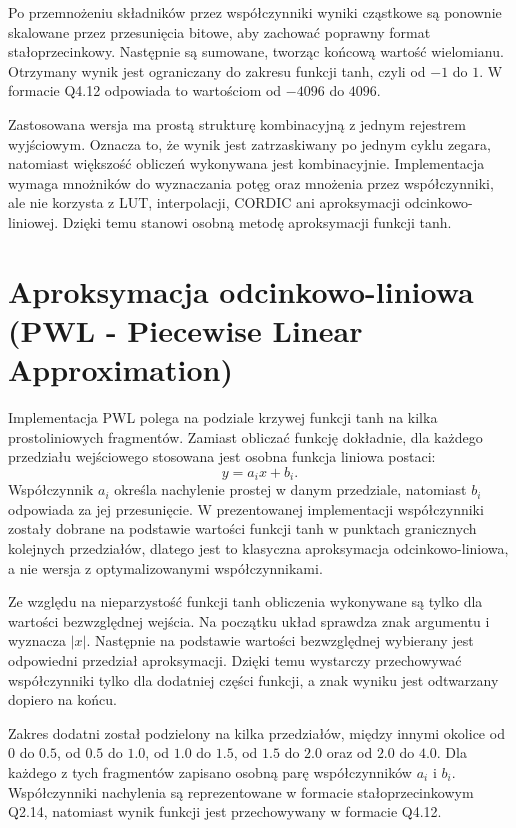 \documentclass[12pt, a4paper, oneside]{scrreprt}
\begin{document}
Po przemnożeniu składników przez współczynniki wyniki cząstkowe są ponownie skalowane
przez przesunięcia bitowe, aby zachować poprawny format stałoprzecinkowy.
Następnie są sumowane, tworząc końcową wartość wielomianu. Otrzymany wynik jest
ograniczany do zakresu funkcji tanh, czyli od $-1$ do $1$. W formacie Q4.12 odpowiada
to wartościom od $-4096$ do $4096$.

Zastosowana wersja ma prostą strukturę kombinacyjną z jednym rejestrem wyjściowym.
Oznacza to, że wynik jest zatrzaskiwany po jednym cyklu zegara, natomiast większość
obliczeń wykonywana jest kombinacyjnie. Implementacja wymaga mnożników do wyznaczania
potęg oraz mnożenia przez współczynniki, ale nie korzysta z LUT, interpolacji,
CORDIC ani aproksymacji odcinkowo-liniowej. Dzięki temu stanowi osobną metodę
aproksymacji funkcji tanh.

\section{Aproksymacja odcinkowo-liniowa (PWL - Piecewise Linear Approximation)}


Implementacja PWL polega na podziale krzywej funkcji tanh na kilka prostoliniowych
fragmentów. Zamiast obliczać funkcję dokładnie, dla każdego przedziału wejściowego
stosowana jest osobna funkcja liniowa postaci:
\[
y = a_i x + b_i.
\]
Współczynnik $a_i$ określa nachylenie prostej w danym przedziale, natomiast $b_i$ odpowiada
za jej przesunięcie. W prezentowanej implementacji współczynniki zostały dobrane na podstawie
wartości funkcji tanh w punktach granicznych kolejnych przedziałów, dlatego jest to klasyczna
aproksymacja odcinkowo-liniowa, a nie wersja z optymalizowanymi współczynnikami.

Ze względu na nieparzystość funkcji tanh obliczenia wykonywane są tylko dla wartości
bezwzględnej wejścia. Na początku układ sprawdza znak argumentu i wyznacza $|x|$.
Następnie na podstawie wartości bezwzględnej wybierany jest odpowiedni przedział aproksymacji.
Dzięki temu wystarczy przechowywać współczynniki tylko dla dodatniej części funkcji,
a znak wyniku jest odtwarzany dopiero na końcu.

Zakres dodatni został podzielony na kilka przedziałów, między innymi okolice od $0$ do $0.5$,
od $0.5$ do $1.0$, od $1.0$ do $1.5$, od $1.5$ do $2.0$ oraz od $2.0$ do $4.0$.
Dla każdego z tych fragmentów zapisano osobną parę współczynników $a_i$ i $b_i$.
Współczynniki nachylenia są reprezentowane w formacie stałoprzecinkowym Q2.14,
natomiast wynik funkcji jest przechowywany w formacie Q4.12.
\end{document}
